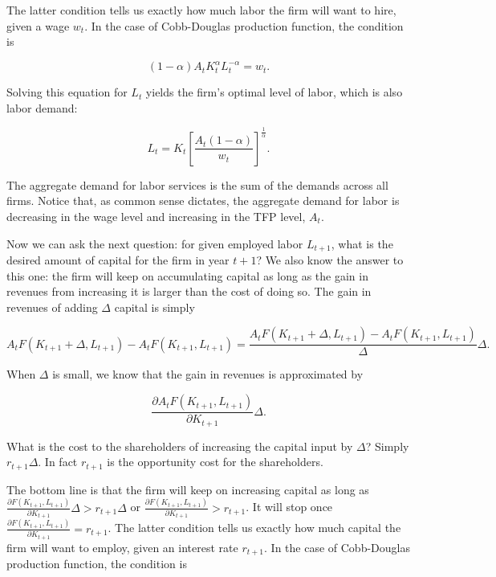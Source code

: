 \documentclass[letterpaper,12pt]{article}
\begin{document}
The latter condition tells us exactly how much labor the firm will want to hire, given a wage
$w_{t}$. In the case of Cobb-Douglas production function, the condition is

\begin{equation*}
(1-\alpha)A_{t}K_{t}^{\alpha}L_{t}^{-\alpha}=w_{t}.
\end{equation*}

Solving this equation for $L_{t}$ yields the firm's optimal level of labor, which is also labor
demand:

\begin{equation*}
L_{t}=K_{t}\left[\frac{A_{t}(1-\alpha)}{w_{t}}\right]^{\frac{1}{\alpha}}.
\end{equation*}

The aggregate demand for labor services is the sum of the demands across all firms. Notice that,
as common sense dictates, the aggregate demand for labor is decreasing in the wage level and
increasing in the TFP level, $A_{t}$.

Now we can ask the next question: for given employed labor
$L_{t+1}$, what is the desired amount of capital for the firm in
year $t+1$? We also know the answer to this one: the firm will
keep on accumulating capital as long as the gain in revenues from
increasing it is larger than the cost of doing so. The gain in
revenues of adding $\Delta$ capital is simply

\begin{equation*}
A_{t}F(K_{t+1}+\Delta,L_{t+1})-A_{t}F(K_{t+1},L_{t+1})=\frac{A_{t}F(K_{t+1}+\Delta,L_{t+1})-A_{t}F(K_{t+1},L_{t+1})}{\Delta}\Delta.
\end{equation*}

When $\Delta$ is small, we know that the gain in revenues is
approximated by

\begin{equation*}
\frac{\partial A_{t}F(K_{t+1},L_{t+1})}{\partial K_{t+1}}\Delta.
\end{equation*}

What is the cost to the shareholders of increasing the capital input by $\Delta$? Simply
$r_{t+1}\Delta$. In fact $r_{t+1}$ is the opportunity cost for the shareholders.

The bottom line is that the firm will keep on increasing capital as long as $\frac{\partial
F(K_{t+1},L_{t+1})}{\partial K_{t+1}}\Delta>r_{t+1}\Delta$ or $\frac{\partial
F(K_{t+1},L_{t+1})}{\partial K_{t+1}}>r_{t+1}$. It will stop once $\frac{\partial
F(K_{t+1},L_{t+1})}{\partial K_{t+1}}=r_{t+1}$. The latter condition tells us exactly how much
capital the firm will want to employ, given an interest rate $r_{t+1}$. In the case of
Cobb-Douglas production function, the condition is
\end{document}

